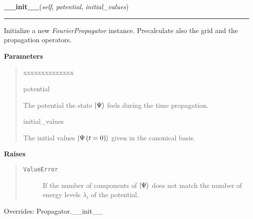 \hspace{.8\funcindent}\begin{boxedminipage}{\funcwidth}

    \raggedright \textbf{\_\_init\_\_}(\textit{self}, \textit{potential}, \textit{initial\_values})

    \vspace{-1.5ex}

    \rule{\textwidth}{0.5\fboxrule}
\setlength{\parskip}{2ex}
    Initialize a new \textit{FourierPropagator} instance. Precalculate also
    the grid and the propagation operators.

\setlength{\parskip}{1ex}
      \textbf{Parameters}
      \vspace{-1ex}

      \begin{quote}
        \begin{Ventry}{xxxxxxxxxxxxxx}

          \item[potential]

          The potential the state
          $\Ket{\Psi}$ feels during the
          time propagation.

          \item[initial\_values]

          The initial values
          $\Ket{\Psi\left( t=0 \right)}$
          given in the canonical basis.

        \end{Ventry}

      \end{quote}

\setlength{\parskip}{1ex}
      \textbf{Raises}
    \vspace{-1ex}

      \begin{quote}
        \begin{description}

          \item[\texttt{ValueError}]

          If the number of components of
          $\Ket{\Psi}$ does not match the
          number of energy levels $\lambda_i$ of the
          potential.

        \end{description}

      \end{quote}

      Overrides: Propagator.\_\_init\_\_

    \end{boxedminipage}

